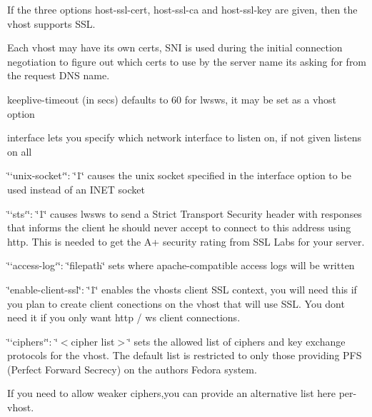 \begin{DoxyItemize}
\item If the three options {\ttfamily host-\/ssl-\/cert}, {\ttfamily host-\/ssl-\/ca} and {\ttfamily host-\/ssl-\/key} are given, then the vhost supports S\+SL.
\end{DoxyItemize}

Each vhost may have its own certs, S\+NI is used during the initial connection negotiation to figure out which certs to use by the server name it\textquotesingle{}s asking for from the request D\+NS name.


\begin{DoxyItemize}
\item {\ttfamily keeplive-\/timeout} (in secs) defaults to 60 for lwsws, it may be set as a vhost option
\item {\ttfamily interface} lets you specify which network interface to listen on, if not given listens on all
\item \char`\"{}`unix-\/socket`\char`\"{}\+: \char`\"{}1\char`\"{} causes the unix socket specified in the interface option to be used instead of an I\+N\+ET socket
\item \char`\"{}`sts`\char`\"{}\+: \char`\"{}1\char`\"{} causes lwsws to send a Strict Transport Security header with responses that informs the client he should never accept to connect to this address using http. This is needed to get the A+ security rating from S\+SL Labs for your server.
\item \char`\"{}`access-\/log`\char`\"{}\+: \char`\"{}filepath\char`\"{} sets where apache-\/compatible access logs will be written
\item {\ttfamily \char`\"{}enable-\/client-\/ssl\char`\"{}}\+: {\ttfamily \char`\"{}1\char`\"{}} enables the vhost\textquotesingle{}s client S\+SL context, you will need this if you plan to create client conections on the vhost that will use S\+SL. You don\textquotesingle{}t need it if you only want http / ws client connections.
\item \char`\"{}`ciphers`\char`\"{}\+: \char`\"{}$<$cipher list$>$\char`\"{} sets the allowed list of ciphers and key exchange protocols for the vhost. The default list is restricted to only those providing P\+FS (Perfect Forward Secrecy) on the author\textquotesingle{}s Fedora system.
\end{DoxyItemize}

If you need to allow weaker ciphers,you can provide an alternative list here per-\/vhost.


